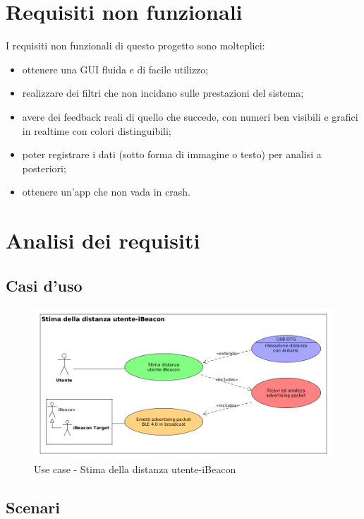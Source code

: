 \section{Requisiti non funzionali}
I requisiti non funzionali di questo progetto sono molteplici:
\begin{itemize}
	\item ottenere una GUI fluida e di facile utilizzo;
	
	\item realizzare dei filtri che non incidano sulle prestazioni del sistema;
	
	\item avere dei feedback reali di quello che succede, con numeri ben visibili e grafici in realtime con colori distinguibili;
	
	\item poter registrare i dati (sotto forma di immagine o testo) per analisi a posteriori;
	
	\item ottenere un'app che non vada in crash.
\end{itemize}

\section{Analisi dei requisiti}
\subsection{Casi d'uso}
\begin{figure}[ph]
	\centering
	\includegraphics[scale=.45]{img/uml/use_case/use_case1}
	\caption[Use case - Stima della distanza utente-iBeacon]{Use case - Stima della distanza utente-iBeacon}
	\label{fig:usecase}
\end{figure}

\subsection{Scenari}

